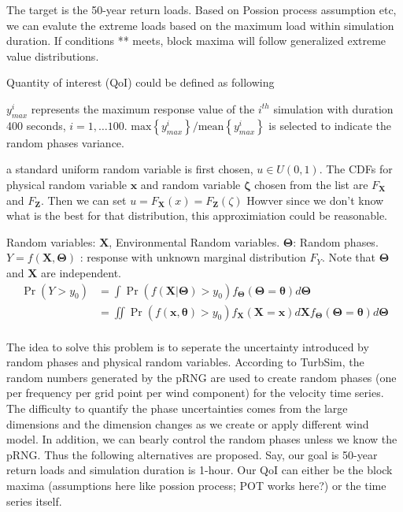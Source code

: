 \documentclass[twocolumn,10pt]{asme2e}
\newcommand{\bs}[1]{\boldsymbol{#1}}
\begin{document}
The target is the 50-year return loads. Based on Possion process assumption etc, we can evalute the extreme loads based on the maximum load within simulation duration. If conditions ** meets, block maxima will follow generalized extreme value distributions.

Quantity of interest (QoI) could be defined as following


$y_{max} ^i$ represents the maximum response value of the $i^{th}$ simulation with duration 400 seconds, $i = 1, \dots 100$.  $\mathrm{max}\left\{ y_{max}^i \right\} / \mathrm{mean}\left\{  y_{max}^i \right\}  $ is selected to indicate the random phases variance. 

a standard uniform random variable is first chosen, $u \in U(0,1)$. The CDFs for physical random variable $\bs{x}$ and random variable $\bs{\zeta}$ chosen from the list are $F_{\bs{X}}$ and $F_{\bs{Z}}$. Then we can set $u = F_{\bs{X}}(x) = F_{\bs{Z}}(\zeta)$
Howver since we don't know what is the best for that distribution, this approximiation could be reasonable.

Random variables: $\bs{X}$, Environmental Random variables. $\bs{\Theta}$: Random phases. $Y = f(\bs{X}, \bs{\Theta})$ : response with unknown marginal distribution $F_Y$. Note that $\bs{\Theta}$ and $\bs{X}$ are independent.
\begin{equation}
  \begin{aligned}
  \Pr \left( Y > y_0 \right) 
  &= \int \Pr \left( f(\bs{X} | \bs{\Theta}) > y_0 \right) f_{\bs{\Theta}}\left( \bs{\Theta} = \bs{\theta} \right) d \bs{\Theta} \\
  &=\iint \Pr \left( f(\bs{x},\bs{\theta}) > y_0  \right) f_{\bs{X}}(\bs{X} = \bs{x}) d \bs{X} f_{\bs{\Theta}}\left( \bs{\Theta} = \bs{\theta} \right) d \bs{\Theta}   \\ 
  \end{aligned}
  \label{eqn:Reli_PCE_WindTurbine}
\end{equation}

The idea to solve this problem is to seperate the uncertainty introduced by random phases and physical random variables. According to TurbSim, the random numbers generated by the pRNG are used to create random phases (one per frequency per grid point per wind component) for the velocity time series. The difficulty to quantify the phase uncertainties comes from the large dimensions and the dimension changes as we create or apply different wind model. In addition, we can bearly control the random phases unless we know the pRNG. Thus the following alternatives are proposed. Say, our goal is 50-year return loads and simulation duration is 1-hour. Our QoI can either be the block maxima (assumptions here like possion process; POT works here?) or the time series itself.
\end{document}
